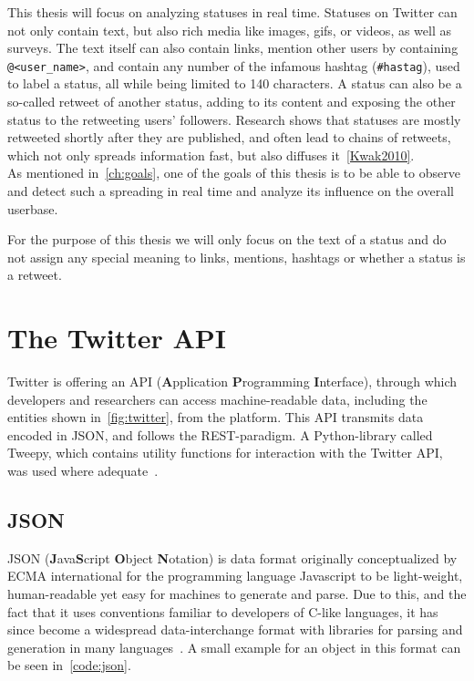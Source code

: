 \par
This thesis will focus on analyzing statuses in real time.
Statuses on Twitter can not only contain text, but also rich media like images, gifs, or videos, as well as surveys.
The text itself can also contain links, mention other users by containing \texttt{@<user\_name>},
and contain any number of the infamous hashtag (\texttt{\#hastag}), used to label a status, all while being limited to 140 characters.
A status can also be a so-called retweet of another status, adding to its content and exposing the other status to the retweeting users' followers.
Research shows that statuses are mostly retweeted shortly after they are published, and often lead to chains of retweets,
which not only spreads information fast, but also diffuses it~\ref{Kwak2010}.\\
As mentioned in~\ref{ch:goals}, one of the goals of this thesis is to be able to observe and detect such a spreading in real time
and analyze its influence on the overall userbase.
\par
For the purpose of this thesis we will only focus on the text of a status and do not assign any special meaning to links,
mentions, hashtags or whether a status is a retweet.\\


\section{The Twitter API}
\label{sec:theApi}

Twitter is offering an API (\textbf{A}pplication \textbf{P}rogramming \textbf{I}nterface),
through which developers and researchers can access machine-readable data,
including the entities shown in~\ref{fig:twitter}, from the platform.
This API transmits data encoded in JSON, and follows the REST-paradigm.
A Python-library called Tweepy, which contains utility functions for interaction with the Twitter API, was used where adequate~\cite{tweepyDocs}.

\subsection{JSON}
\label{subsec:json}

JSON (\textbf{J}ava\textbf{S}cript \textbf{O}bject \textbf{N}otation) is data format originally conceptualized by ECMA international
for the programming language Javascript to be light-weight, human-readable yet easy for machines to generate and parse.
Due to this, and the fact that it uses conventions familiar to developers of C-like languages,
it has since become a widespread data-interchange format with libraries for parsing and generation in many languages~\cite{jsonDocs}.
A small example for an object in this format can be seen in~\ref{code:json}.


